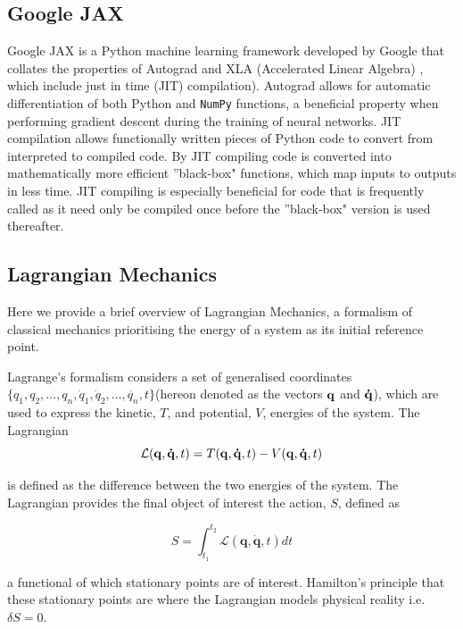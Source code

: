 \documentclass[10pt]{iopart}
\begin{document}
\subsection{Google JAX}
Google JAX \cite{Jax} is a Python machine learning framework developed by Google that collates the properties of Autograd \cite{Autograd} and XLA (Accelerated Linear Algebra) \cite{XLA}, which include just in time (JIT) compilation). Autograd allows for automatic differentiation of both Python and \texttt{NumPy} functions, a beneficial property when performing gradient descent during the training of neural networks. JIT compilation allows functionally written pieces of Python code to convert from interpreted to compiled code. By JIT compiling code is converted into mathematically more efficient ''black-box" functions, which map inputs to outputs in less time. JIT compiling is especially beneficial for code that is frequently called as it need only be compiled once before the ''black-box" version is used thereafter.


\subsection{Lagrangian Mechanics}
Here we provide a brief overview of Lagrangian Mechanics, a formalism of classical mechanics prioritising the energy of a system as its initial reference point. 

Lagrange's formalism considers a set of generalised coordinates $\{q_1,q_2,\ldots,q_n,\dot{q}_1,\dot{q}_2,\ldots,\dot{q_n},t\}$(hereon denoted as the vectors $\bold{q}$ and $\bold{\dot{q}}$), which are used to express the kinetic, $T$, and potential, $V$, energies of the system. The Lagrangian 
\begin{equation}
	\mathcal{L}(\bold{q},\bold{\dot{q}},t) = T(\bold{q},\bold{\dot{q}},t) - V(\bold{q},\bold{\dot{q}},t)
\end{equation}

\noindent is defined as the difference between the two energies of the system. The Lagrangian provides the final object of interest the action, $S$, defined as

\begin{equation}
		S = \int_{t_1}^{t_2} \mathcal{L}(\mathbf{q},\mathbf{\dot{q}},t) dt
\end{equation}

\noindent a functional of which stationary points are of interest. Hamilton's principle \cite{Goldstein} that these stationary points are where the Lagrangian models physical reality i.e. $\delta S = 0$. 
\end{document}
